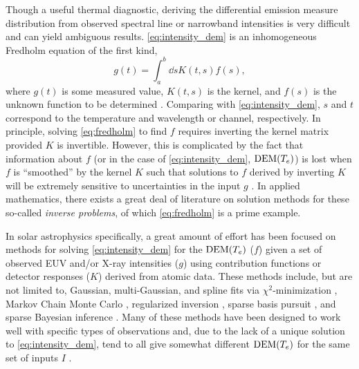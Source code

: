 Though a useful thermal diagnostic, deriving the differential emission measure distribution from observed spectral line or narrowband intensities is very difficult and can yield ambiguous results. \autoref{eq:intensity_dem} is an inhomogeneous Fredholm equation of the first kind,
\begin{equation}\label{eq:fredholm}
    g(t) = \int_a^b\dd{s}K(t,s)f(s),
\end{equation}
where $g(t)$ is some measured value, $K(t,s)$ is the kernel, and $f(s)$ is the unknown function to be determined \citep{press_numerical_1992}. Comparing with \autoref{eq:intensity_dem}, $s$ and $t$ correspond to the temperature and wavelength or channel, respectively. In principle, solving \autoref{eq:fredholm} to find $f$ requires inverting the kernel matrix provided $K$ is invertible. However, this is complicated by the fact that information about $f$ (or in the case of \autoref{eq:intensity_dem}, $\textup{DEM}(T_e)$) is lost when $f$ is ``smoothed'' by the kernel $K$ such that solutions to $f$ derived by inverting $K$ will be extremely sensitive to uncertainties in the input $g$ \citep{press_numerical_1992}. In applied mathematics, there exists a great deal of literature on solution methods for these so-called \textit{inverse problems}, of which \autoref{eq:fredholm} is a prime example.

In solar astrophysics specifically, a great amount of effort has been focused on methods for solving \autoref{eq:intensity_dem} for the $\textup{DEM}(T_e)$ ($f$) given a set of observed EUV and/or X-ray intensities ($g$) using contribution functions or detector responses ($K$) derived from atomic data. These methods include, but are not limited to, Gaussian, multi-Gaussian, and spline fits via $\chi^2$-minimization \citep[e.g.][]{guennou_accuracy_2012,warren_observations_2013,ryan_compatibility_2014,caspi_constraining_2014}, Markov Chain Monte Carlo \citep[MCMC,][]{kashyap_markov-chain_1998}, regularized inversion \citep{hannah_differential_2012,plowman_fast_2013}, sparse basis pursuit \citep{cheung_thermal_2015}, and sparse Bayesian inference \citep{warren_sparse_2017}. Many of these methods have been designed to work well with specific types of observations and, due to the lack of a unique solution to \autoref{eq:intensity_dem}, tend to all give somewhat different $\textup{DEM}(T_e)$ for the same set of inputs $I$ \citep[see comparison of 15 different methods by][]{aschwanden_benchmark_2015}.

